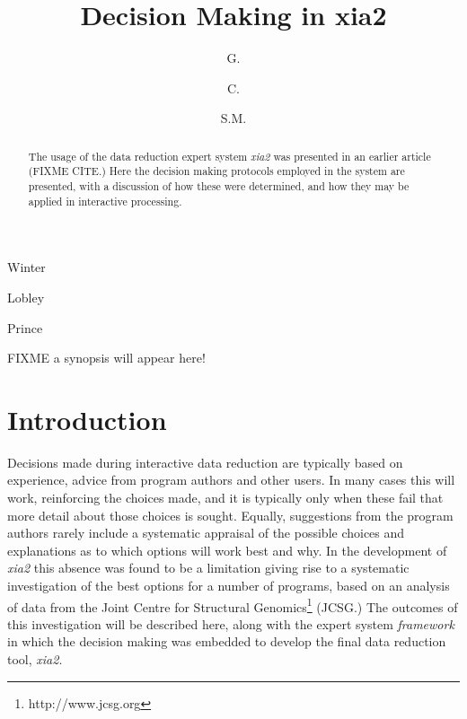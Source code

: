 \documentclass[preprint,pdf]{iucr}
\begin{document}
\title{Decision Making in xia2}

\author[a]{G.}{Winter}
\author[a]{C.}{Lobley}
\author[b]{S.M.}{Prince}


\maketitle
\clearpage

\begin{synopsis}
FIXME a synopsis will appear here!
\end{synopsis}

\begin{abstract}

The usage of the data reduction expert system \emph{xia2} was
presented in an earlier article (FIXME CITE.) Here the decision making
protocols employed in the system are presented, with a discussion
of how these were determined, and how they may be applied in interactive
processing. 

\end{abstract}

\section{Introduction}

Decisions made during interactive data reduction are typically based
on experience, advice from program authors and other users. In many
cases this will work, reinforcing the choices made, and it is typically
only when these fail that more detail about those choices is
sought. Equally, suggestions from the program authors rarely include a
systematic appraisal of the possible choices and explanations as to
which options will work best and why. 
In the development of \emph{xia2} this absence was found
to be a limitation giving rise to a systematic investigation of the best
options for a number of programs, 
based on an analysis of data from the Joint Centre
for Structural Genomics\footnote{http://www.jcsg.org} (JCSG.) The
outcomes of this investigation will be described here, along with the
expert system \emph{framework} in which the decision making was
embedded to develop the final data reduction tool, \emph{xia2}.
\end{document}
